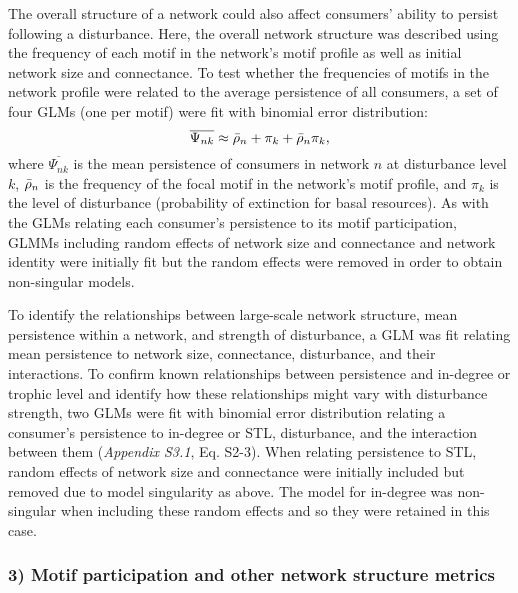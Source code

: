 \documentclass[12pt]{article}
\begin{document}
\begin{spacing}{1.0}
            The overall structure of a network could also affect consumers' ability to persist following a disturbance.
            Here, the overall network structure was described using the frequency of each motif in the network's motif profile as well as initial network size and connectance.
            To test whether the frequencies of motifs in the network profile were related to the average persistence of all consumers, a set of four GLMs  (one per motif) were fit with binomial error distribution:
                \begin{equation}
                    \overline{\Psi_{nk}} \approx \Bar{\rho}_{n} + \pi_{k} + \Bar{\rho}_{n}\pi_{k},
                    \label{netpropeq}
                \end{equation}
            \noindent where $\overline{\Psi_{nk}}$ is the mean persistence of consumers in network $n$ at disturbance level $k$, $\Bar{\rho}_{n}$ is the frequency of the focal motif in the network's motif profile, and $\pi_k$ is the level of disturbance (probability of extinction for basal resources).
            As with the GLMs relating each consumer's persistence to its motif participation, GLMMs including random effects of network size and connectance and network identity were initially fit but the random effects were removed in order to obtain non-singular models.


            To identify the relationships between large-scale network structure,  mean persistence within a network, and strength of disturbance, a GLM was fit relating mean persistence to network size, connectance, disturbance, and their interactions.
            To confirm known relationships between persistence and in-degree or trophic level and identify how these relationships might vary with disturbance strength, two GLMs were fit with binomial error distribution relating a consumer's persistence to in-degree or STL, disturbance, and the interaction between them (\emph{Appendix S3.1}, Eq. S2-3).
            When relating persistence to STL, random effects of network size and connectance were initially included but removed due to model singularity as above.
            The model for in-degree was non-singular when including these random effects and so they were retained in this case.



        \subsubsection*{3) Motif participation and other network structure metrics}


\end{spacing}
\end{document}
